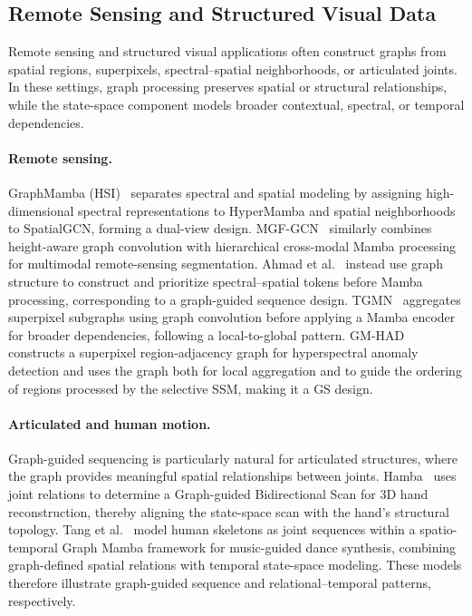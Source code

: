 \documentclass[acmsmall]{acmart}
\begin{document}
\subsection{Remote Sensing and Structured Visual Data}
\label{sec:remote-visual}

Remote sensing and structured visual applications often construct graphs from
spatial regions, superpixels, spectral--spatial neighborhoods, or articulated
joints. In these settings, graph processing preserves spatial or structural
relationships, while the state-space component models broader contextual,
spectral, or temporal dependencies. %

\paragraph{\textbf{Remote sensing.}}
GraphMamba (HSI)~\cite{yang2024graphmamba} separates spectral and spatial
modeling by assigning high-dimensional spectral representations to HyperMamba
and spatial neighborhoods to SpatialGCN, forming a dual-view design.
MGF-GCN~\cite{zhao2025mgf} similarly combines height-aware graph convolution
with hierarchical cross-modal Mamba processing for multimodal remote-sensing
segmentation. Ahmad et al.~\cite{ahmad2025graphmamba} instead use graph
structure to construct and prioritize spectral--spatial tokens before Mamba
processing, corresponding to a graph-guided sequence design.
TGMN~\cite{chu2025tgmn} aggregates superpixel subgraphs using graph
convolution before applying a Mamba encoder for broader dependencies, following
a local-to-global pattern. GM-HAD~\cite{tang2026graph} constructs a
superpixel region-adjacency graph for hyperspectral anomaly detection and uses
the graph both for local aggregation and to guide the ordering of regions
processed by the selective SSM, making it a GS design.

\paragraph{\textbf{Articulated and human motion.}}
Graph-guided sequencing is particularly natural for articulated structures,
where the graph provides meaningful spatial relationships between joints.
Hamba~\cite{dong2024hamba} uses joint relations to determine a
Graph-guided Bidirectional Scan for 3D hand reconstruction, thereby aligning
the state-space scan with the hand's structural topology. Tang et
al.~\cite{tang2025spatial} model human skeletons as joint sequences within a
spatio-temporal Graph Mamba framework for music-guided dance synthesis,
combining graph-defined spatial relations with temporal state-space modeling.
These models therefore illustrate graph-guided sequence and relational--temporal patterns,
respectively.
\end{document}
